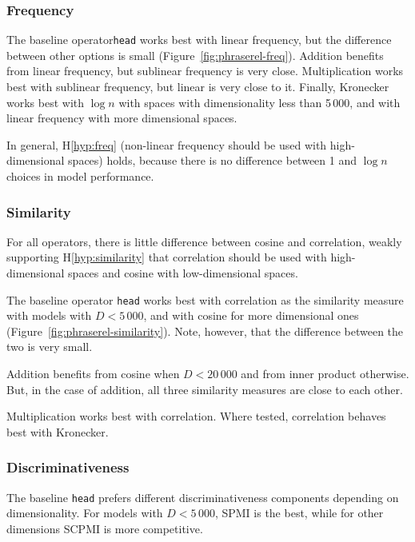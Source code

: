 \subsubsection{Frequency}
\label{sec:frequency-phraserel}

The baseline operator\texttt{head} works best with linear frequency, but the difference between other options is small (Figure~\ref{fig:phraserel-freq}). Addition benefits from linear frequency, but sublinear frequency is very close. Multiplication works best with sublinear frequency, but linear is very close to it. Finally, Kronecker works best with $\log n$ with spaces with dimensionality less than 5\,000, and with linear frequency with more dimensional spaces.

In general, H\ref{hyp:freq} (non-linear frequency should be used with high-dimensional spaces) holds, because there is no difference between 1 and $\log n$ choices in model performance.



\subsubsection{Similarity}
\label{sec:similarity-phraserel}

For all operators, there is little difference between cosine and correlation, weakly supporting H\ref{hyp:similarity} that correlation should be used with high-dimensional spaces and cosine with low-dimensional spaces.

The baseline operator \texttt{head} works best with correlation as the similarity measure with models with $D < 5\,000$, and with cosine for more dimensional ones (Figure~\ref{fig:phraserel-similarity}). Note, however, that the difference between the two is very small.

Addition benefits from cosine when $D < 20\,000$ and from inner product otherwise. But, in the case of addition, all three similarity measures are close to each other.

Multiplication works best with correlation. Where tested, correlation behaves best with Kronecker.

\subsubsection{Discriminativeness}
\label{sec:discriminativeness-phraserel}



The baseline \texttt{head} prefers different discriminativeness components depending on dimensionality. For models with $D < 5\,000$, SPMI is the best, while for other dimensions SCPMI is more competitive.

